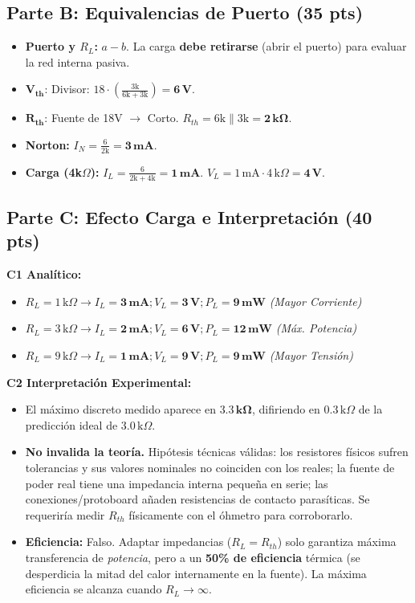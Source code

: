 \documentclass[11pt, a4paper]{article}
\begin{document}
\subsection*{Parte B: Equivalencias de Puerto (35 pts)}
\begin{itemize}
    \item \textbf{Puerto y $R_L$:} $a-b$. La carga \textbf{debe retirarse} (abrir el puerto) para evaluar la red interna pasiva.
    \item $\mathbf{V_{th}}$: Divisor: $18 \cdot \left(\frac{3\text{k}}{6\text{k}+3\text{k}}\right) = \mathbf{6\,\text{V}}$.
    \item $\mathbf{R_{th}}$: Fuente de 18V $\rightarrow$ Corto. $R_{th} = 6\text{k} \parallel 3\text{k} = \mathbf{2\,\text{k}\Omega}$.
    \item \textbf{Norton:} $I_N = \frac{6}{2\text{k}} = \mathbf{3\,\text{mA}}$.
    \item \textbf{Carga (4k$\Omega$):} $I_L = \frac{6}{2\text{k} + 4\text{k}} = \mathbf{1\,\text{mA}}$. \quad $V_L = 1\,\text{mA} \cdot 4\,\text{k}\Omega = \mathbf{4\,\text{V}}$.
\end{itemize}

\subsection*{Parte C: Efecto Carga e Interpretación (40 pts)}
\textbf{C1 Analítico:}
\begin{itemize}
    \item $R_L = 1\,\text{k}\Omega \rightarrow I_L = \mathbf{3\,\text{mA}}; V_L = \mathbf{3\,\text{V}}; P_L = \mathbf{9\,\text{mW}}$ \quad \textit{(Mayor Corriente)}
    \item $R_L = 3\,\text{k}\Omega \rightarrow I_L = \mathbf{2\,\text{mA}}; V_L = \mathbf{6\,\text{V}}; P_L = \mathbf{12\,\text{mW}}$ \quad \textit{(Máx. Potencia)}
    \item $R_L = 9\,\text{k}\Omega \rightarrow I_L = \mathbf{1\,\text{mA}}; V_L = \mathbf{9\,\text{V}}; P_L = \mathbf{9\,\text{mW}}$ \quad \textit{(Mayor Tensión)}
\end{itemize}

\textbf{C2 Interpretación Experimental:}
\begin{itemize}
    \item El máximo discreto medido aparece en $\mathbf{3.3\,\text{k}\Omega}$, difiriendo en $0.3\,\text{k}\Omega$ de la predicción ideal de $3.0\,\text{k}\Omega$.
    \item \textbf{No invalida la teoría.} Hipótesis técnicas válidas: los resistores físicos sufren tolerancias y sus valores nominales no coinciden con los reales; la fuente de poder real tiene una impedancia interna pequeña en serie; las conexiones/protoboard añaden resistencias de contacto parasíticas. Se requeriría medir $R_{th}$ físicamente con el óhmetro para corroborarlo.
    \item \textbf{Eficiencia:} Falso. Adaptar impedancias ($R_L = R_{th}$) solo garantiza máxima transferencia de \textit{potencia}, pero a un \textbf{50\% de eficiencia} térmica (se desperdicia la mitad del calor internamente en la fuente). La máxima eficiencia se alcanza cuando $R_L \to \infty$.
\end{itemize}
\end{document}
